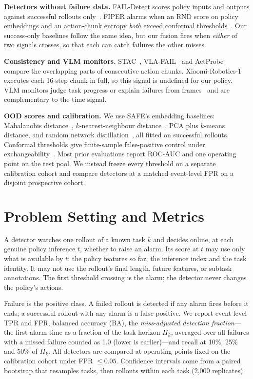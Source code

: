 \documentclass[conference,a4paper]{IEEEtran}
\begin{document}
\textbf{Detectors without failure data.} FAIL-Detect scores policy inputs and outputs
against successful rollouts only~\cite{xu2025faildetect}. FIPER alarms when an RND score on
policy embeddings and an action-chunk entropy \emph{both} exceed conformal
thresholds~\cite{romer2025fiper}. Our success-only baselines follow the same idea, but our
fusion fires when \emph{either} of two signals crosses, so that each can catch failures the
other misses.

\textbf{Consistency and VLM monitors.} STAC~\cite{agia2024sentinel},
VLA-FAIL~\cite{seligmann2026vlafail} and ActProbe~\cite{huang2026actprobe} compare the
overlapping parts of consecutive action chunks. Xiaomi-Robotics-1 executes each 16-step chunk
in full, so this signal is undefined for our policy. VLM monitors judge task progress or
explain failures from frames~\cite{agia2024sentinel,duan2025aha} and are complementary to the
time signal.

\textbf{OOD scores and calibration.} We use SAFE's embedding baselines: Mahalanobis
distance~\cite{lee2018mahalanobis}, $k$-nearest-neighbour distance~\cite{sun2022knn}, PCA
plus $k$-means distance, and random network distillation~\cite{burda2019rnd}, all fitted on
successful rollouts. Conformal thresholds give finite-sample false-positive control under
exchangeability~\cite{angelopoulos2021gentle}. Most prior evaluations report ROC-AUC and one
operating point on the test pool. We instead freeze every threshold on a separate calibration
cohort and compare detectors at a matched event-level FPR on a disjoint prospective cohort.

\section{Problem Setting and Metrics}

A detector watches one rollout of a known task $k$ and decides online, at each genuine
policy inference $t$, whether to raise an alarm. Its score at $t$ may use only what is
available by $t$: the policy features so far, the inference index and the task identity.
It may not use the rollout's final length, future features, or subtask annotations. The
first threshold crossing is the alarm; the detector never changes the policy's actions.

Failure is the positive class. A failed rollout is detected if any alarm fires before it
ends; a successful rollout with any alarm is a false positive. We report event-level TPR
and FPR, balanced accuracy (BA), the \emph{miss-adjusted detection fraction}---the
first-alarm time as a fraction of the task horizon $H_k$, averaged over all failures with a
missed failure counted as 1.0 (lower is earlier)---and recall at 10\%, 25\% and 50\% of
$H_k$. All detectors are compared at operating points fixed on the calibration cohort under
FPR $\le 0.05$. Confidence intervals come from a paired bootstrap that resamples tasks, then
rollouts within each task (2,000 replicates).
\end{document}
